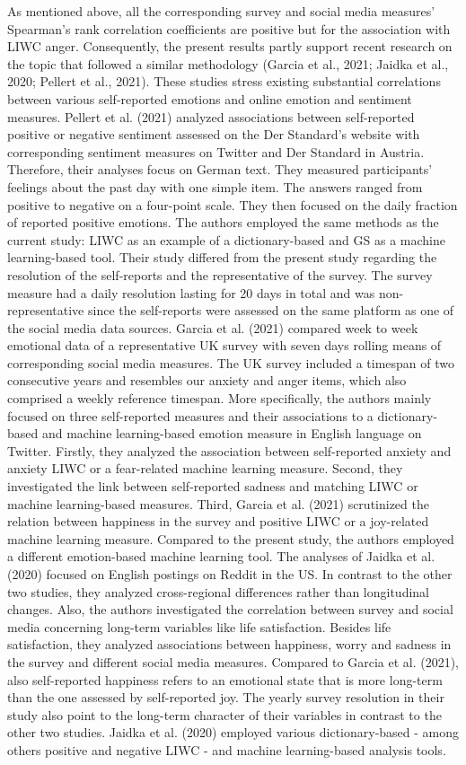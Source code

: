\documentclass[
  english,
  jou,floatsintext]{apa7}
\begin{document}
As mentioned above, all the corresponding survey and social media measures' Spearman's rank correlation coefficients are positive but for the association with LIWC anger. Consequently, the present results partly support recent research on the topic that followed a similar methodology (Garcia et al., 2021; Jaidka et al., 2020; Pellert et al., 2021). These studies stress existing substantial correlations between various self-reported emotions and online emotion and sentiment measures.
Pellert et al. (2021) analyzed associations between self-reported positive or negative sentiment assessed on the Der Standard's website with corresponding sentiment measures on Twitter and Der Standard in Austria. Therefore, their analyses focus on German text. They measured participants' feelings about the past day with one simple item. The answers ranged from positive to negative on a four-point scale. They then focused on the daily fraction of reported positive emotions. The authors employed the same methods as the current study: LIWC as an example of a dictionary-based and GS as a machine learning-based tool. Their study differed from the present study regarding the resolution of the self-reports and the representative of the survey. The survey measure had a daily resolution lasting for 20 days in total and was non-representative since the self-reports were assessed on the same platform as one of the social media data sources.
Garcia et al. (2021) compared week to week emotional data of a representative UK survey with seven days rolling means of corresponding social media measures.
The UK survey included a timespan of two consecutive years and resembles our anxiety and anger items, which also comprised a weekly reference timespan. More specifically, the authors mainly focused on three self-reported measures and their associations to a dictionary-based and machine learning-based emotion measure in English language on Twitter. Firstly, they analyzed the association between self-reported anxiety and anxiety LIWC or a fear-related machine learning measure. Second, they investigated the link between self-reported sadness and matching LIWC or machine learning-based measures. Third, Garcia et al. (2021) scrutinized the relation between happiness in the survey and positive LIWC or a joy-related machine learning measure. Compared to the present study, the authors employed a different emotion-based machine learning tool.
The analyses of Jaidka et al. (2020) focused on English postings on Reddit in the US. In contrast to the other two studies, they analyzed cross-regional differences rather than longitudinal changes. Also, the authors investigated the correlation between survey and social media concerning long-term variables like life satisfaction. Besides life satisfaction, they analyzed associations between happiness, worry and sadness in the survey and different social media measures. Compared to Garcia et al. (2021), also self-reported happiness refers to an emotional state that is more long-term than the one assessed by self-reported joy. The yearly survey resolution in their study also point to the long-term character of their variables in contrast to the other two studies. Jaidka et al. (2020) employed various dictionary-based - among others positive and negative LIWC - and machine learning-based analysis tools.
\end{document}
